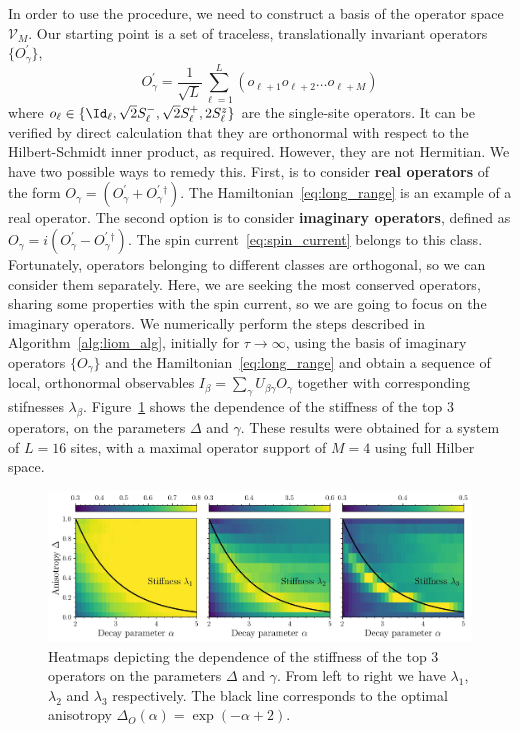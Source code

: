 In order to use the procedure, we need to construct a basis of the operator space \(\mathcal{V}_M\).
Our starting point is a set of traceless, translationally invariant operators \(\{O^{\prime}_{\gamma}\}\),
\begin{equation}
  O^{\prime}_{\gamma} = \frac{1}{\sqrt{L}}\sum_{\ell=1}^L\left( o_{\ell+1}o_{\ell+2}\ldots o_{\ell+M} \right)
  \label{eq:operator_basis}
\end{equation}
where \(o_{\ell} \in \{\Id_{\ell}, \sqrt{2}\Sm_{\ell},\sqrt{2}\Sp_{\ell},2\Sz_{\ell}\}\) are the single-site operators.
It can be verified by direct calculation that they are orthonormal with respect to the Hilbert-Schmidt inner product,
as required. However, they are not Hermitian. We have two possible ways to remedy this. First, is
to consider \textbf{real operators} of the form \(O_{\gamma} = (O^{\prime}_{\gamma} + O^{\prime}_{\gamma}{}^{\dag})\).
The Hamiltonian~\eqref{eq:long_range} is an example of a real operator. The second option is to consider \textbf{imaginary operators},
defined as \(O_{\gamma} = i(O^{\prime}_{\gamma} - O^{\prime}_{\gamma}{}^{\dag})\). The spin current~\eqref{eq:spin_current}
belongs to this class. Fortunately, operators belonging to different classes are orthogonal, so we can
consider them separately. Here, we are seeking the most conserved operators, sharing some properties with
the spin current, so we are going to focus on the imaginary operators. We numerically perform the steps
described in Algorithm~\ref{alg:liom_alg}, initially for \(\tau\to\infty\), using the basis of imaginary operators \(\{O_{\gamma}\}\)
and the Hamiltonian~\eqref{eq:long_range} and obtain a sequence of local, orthonormal observables
\(I_{\beta} = \sum_{\gamma} U_{\beta\gamma} O_{\gamma}\) together with corresponding stifnesses \(\lambda_{\beta}\).
Figure~\ref{fig:stiffness} shows the dependence of the stiffness of the top 3 operators, on the parameters \(\Delta\) and \(\gamma\).
These results were obtained for a system of \(L=16\) sites, with a maximal operator support of \(M=4\) using full Hilber space.

\begin{figure}[htbp]
  \centering
  \includegraphics[width=\linewidth]{Figures/stiffness.jpg}
  \caption{Heatmaps depicting the dependence of the stiffness of the top 3 operators on the parameters \(\Delta\) and \(\gamma\).
    From left to right we have \(\lambda_1\), \(\lambda_2\) and \(\lambda_3\) respectively. The black line corresponds
    to the optimal anisotropy \(\Delta_{O}(\alpha) = \exp(-\alpha + 2)\).}
  \label{fig:stiffness}
\end{figure}

